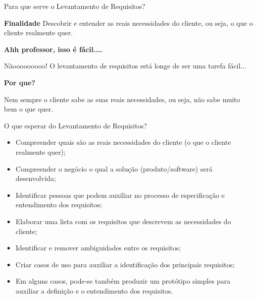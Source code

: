 \documentclass[xcolor=x11names,compress]{beamer}
\begin{document}
\begin{frame}{Para que serve o Levantamento de Requisitos?}

\begin{alertblock}{\textbf{Finalidade}}
Descobrir e entender as reais necessidades do cliente, ou seja, o que o cliente realmente quer.
\end{alertblock}

\pause

\begin{alertblock}{\textbf{Ahh professor, isso é fácil....}}

Nãooooooooo! O levantamento de requisitos está longe de ser uma tarefa fácil...

\end{alertblock}

\pause 

\begin{alertblock}{\textbf{Por que?}}

Nem sempre o cliente sabe as suas reais necessidades, ou seja, não sabe muito bem o que quer.

\end{alertblock}

\end{frame}


\begin{frame}[allowframebreaks=.8]{O que esperar do Levantamento de Requisitos?}

\begin{itemize}
\itemsep 5mm

\item Compreender quais são as reais necessidades do cliente (o que o cliente realmente quer);

\item Compreender o negócio o qual a solução (produto/software) será desenvolvida;

\item Identificar pessoas que podem auxiliar no processo de especificação e entendimento dos requisitos;

\item Elaborar uma lista com os requisitos que descrevem as necessidades do cliente;

\item Identificar e remover ambiguidades entre os requisitos;

\item Criar casos de uso para auxiliar a identificação dos principais requisitos;

\item Em alguns casos, pode-se também produzir um protótipo simples para auxiliar a definição e o entendimento dos requisitos.
\end{itemize}

\end{frame}
\end{document}
